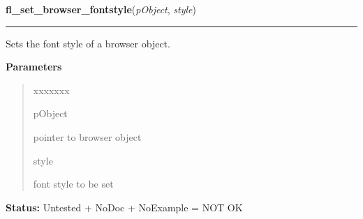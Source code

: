 \hspace{.8\funcindent}\begin{boxedminipage}{\funcwidth}

    \raggedright \textbf{fl\_set\_browser\_fontstyle}(\textit{pObject}, \textit{style})

    \vspace{-1.5ex}

    \rule{\textwidth}{0.5\fboxrule}
\setlength{\parskip}{2ex}
    Sets the font style of a browser object.

\setlength{\parskip}{1ex}
      \textbf{Parameters}
      \vspace{-1ex}

      \begin{quote}
        \begin{Ventry}{xxxxxxx}

          \item[pObject]

          pointer to browser object

          \item[style]

          font style to be set

        \end{Ventry}

      \end{quote}

\textbf{Status:} Untested + NoDoc + NoExample = NOT OK



    \end{boxedminipage}

    \label{xformslib:library:fl_set_browser_specialkey}

    \vspace{0.5ex}

